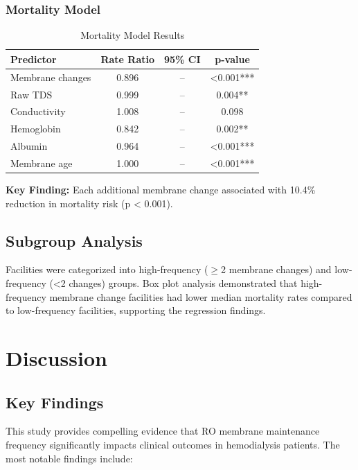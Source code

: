 \documentclass[11pt,a4paper]{article}
\begin{document}
\subsubsection{Mortality Model}

\begin{table}[H]
\centering
\caption{Mortality Model Results}
\begin{tabular}{@{}lccc@{}}
\toprule
\textbf{Predictor} & \textbf{Rate Ratio} & \textbf{95\% CI} & \textbf{p-value} \\
\midrule
Membrane changes & 0.896 & -- & <0.001*** \\
Raw TDS & 0.999 & -- & 0.004** \\
Conductivity & 1.008 & -- & 0.098 \\
Hemoglobin & 0.842 & -- & 0.002** \\
Albumin & 0.964 & -- & <0.001*** \\
Membrane age & 1.000 & -- & <0.001*** \\
\bottomrule
\end{tabular}
\label{tab:mortality}
\end{table}

\textbf{Key Finding:} Each additional membrane change associated with 10.4\% reduction in mortality risk (p < 0.001).

\subsection{Subgroup Analysis}

Facilities were categorized into high-frequency ($\geq$2 membrane changes) and low-frequency (<2 changes) groups. Box plot analysis demonstrated that high-frequency membrane change facilities had lower median mortality rates compared to low-frequency facilities, supporting the regression findings.

\section{Discussion}

\subsection{Key Findings}

This study provides compelling evidence that RO membrane maintenance frequency significantly impacts clinical outcomes in hemodialysis patients. The most notable findings include:
\end{document}
